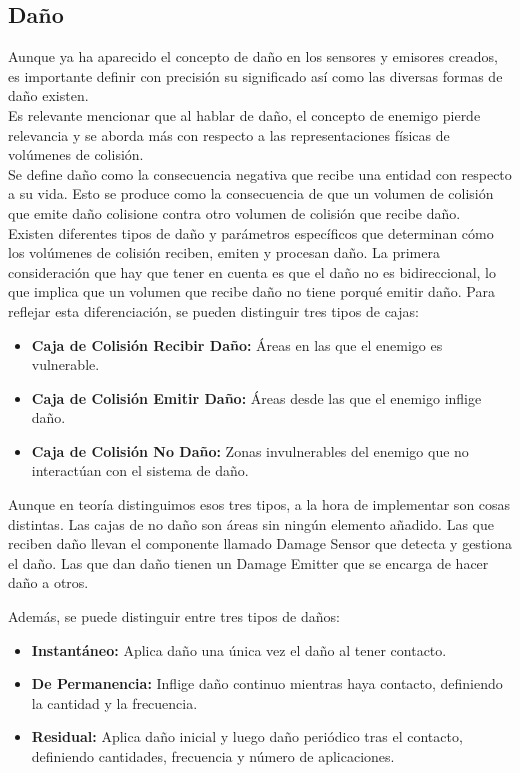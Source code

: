 \subsection{Daño}
Aunque ya ha aparecido el concepto de daño en los sensores y emisores creados, es importante definir con precisión su significado así como las diversas formas de daño existen. \\
Es relevante mencionar que al hablar de daño, el concepto de enemigo pierde relevancia y se aborda más con respecto a las representaciones físicas de volúmenes de colisión.\\
Se define daño como la consecuencia negativa que recibe una entidad con respecto a su vida. Esto se produce como la consecuencia de que un volumen de colisión que emite daño colisione contra otro volumen de colisión que recibe daño.\\
Existen diferentes tipos de daño y parámetros específicos que determinan cómo los volúmenes de colisión reciben, emiten y procesan daño.
La primera consideración que hay que tener en cuenta es que el daño no es bidireccional, lo que implica que un volumen que recibe daño no tiene porqué emitir daño. Para reflejar esta diferenciación, se pueden distinguir tres tipos de cajas:
\begin{itemize}
	 \item \textbf{Caja de Colisión Recibir Daño:} Áreas en las que el enemigo es vulnerable.
	 \item \textbf{Caja de Colisión Emitir Daño:} Áreas desde las que el enemigo inflige daño.
	 \item  \textbf{Caja de Colisión No Daño:} Zonas invulnerables del enemigo que no interactúan con el sistema de daño.
\end{itemize}
Aunque en teoría distinguimos esos tres tipos, a la hora de implementar son cosas distintas. Las cajas de no daño son áreas sin ningún elemento añadido. Las que reciben daño llevan el componente llamado Damage Sensor que detecta y gestiona el daño. Las que dan daño tienen un Damage Emitter que se encarga de hacer daño a otros.

Además, se puede distinguir entre tres tipos de daños:
\begin{itemize}
    \item \textbf{Instantáneo:} Aplica daño una única vez el daño al tener contacto.
    \item \textbf{De Permanencia:} Inflige daño continuo mientras haya contacto, definiendo la cantidad y la frecuencia.
    \item \textbf{Residual:} Aplica daño inicial y luego daño periódico tras el contacto, definiendo cantidades, frecuencia y número de aplicaciones.
\end{itemize}

